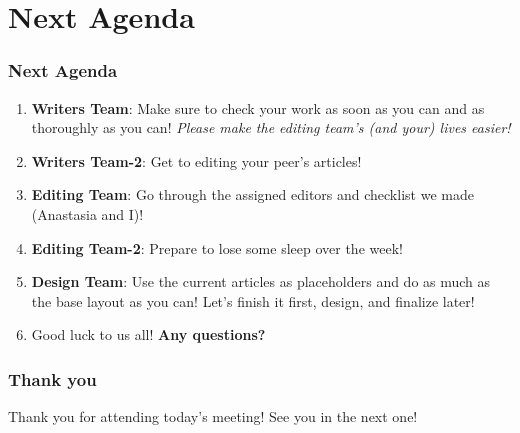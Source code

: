 \documentclass{beamer}
\begin{document}
\section{Next Agenda}
\begin{frame}
    \frametitle{Next Agenda}

    \begin{enumerate}
        \item<1-> \textbf{Writers Team}: Make sure to check your work as soon as you can and as thoroughly as you can! \emph{Please make the editing team's (and your) lives easier!}

        \item<2-> \textbf{Writers Team-2}: Get to editing your peer's articles! 

        \item<3-> \textbf{Editing Team}: Go through the assigned editors and checklist we made (Anastasia and I)!

        \item<4-> \textbf{Editing Team-2}: Prepare to lose some sleep over the week!

        \item<5-> \textbf{Design Team}: Use the current articles as placeholders and do as much as the base layout as you can! Let's finish it first, design, and finalize later! 

        \item<6-> Good luck to us all! \textbf{Any questions?}
    \end{enumerate}

\end{frame}

\begin{frame}
    \frametitle{Thank you}

    Thank you for attending today's meeting! See you in the next one!

\end{frame}
\end{document}
